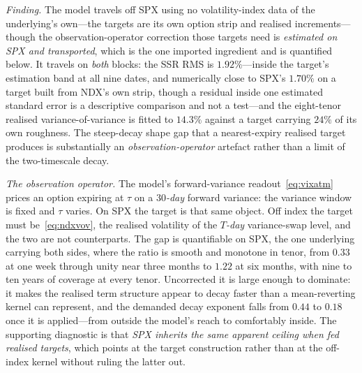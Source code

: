 \documentclass[11pt]{article}
\providecommand{\1}{\mathbf 1}
\begin{document}
\emph{Finding.} The model travels off SPX using no volatility-index data of the underlying's
own---the targets are its own option strip and realised increments---though the
observation-operator correction those targets need is \emph{estimated on SPX and transported}, which
is the one imported ingredient and is quantified below. It travels on \emph{both} blocks: the SSR RMS is $1.92\%$---inside the target's estimation band at all nine dates, and
numerically close to SPX's $1.70\%$ on a target built from NDX's own strip, though a residual
inside one estimated standard error is a descriptive comparison and not a test---and the
eight-tenor realised variance-of-variance is fitted to $14.3\%$ against a target carrying $24\%$ of
its own roughness. The steep-decay shape gap that a nearest-expiry realised target produces is
substantially an \emph{observation-operator} artefact rather than a limit of the two-timescale decay.

\emph{The observation operator.} The model's forward-variance readout~\eqref{eq:vixatm} prices an
option expiring at $\tau$ on a \emph{$30$-day} forward variance: the variance window is fixed and
$\tau$ varies. On SPX the target is that same object. Off index the target must
be~\eqref{eq:ndxvov}, the realised volatility of the \emph{$T$-day} variance-swap level, and the two
are not counterparts. The gap is quantifiable on SPX, the one underlying carrying both sides, where
the ratio is smooth and monotone in
tenor, from $0.33$ at one week through unity near three months to $1.22$ at six months, with nine to
ten years of coverage at every tenor. Uncorrected it is large enough to dominate: it makes the
realised term structure appear to decay faster than a mean-reverting kernel can represent, and the
demanded decay exponent falls from $0.44$ to $0.18$ once it is applied---from outside the model's
reach to comfortably inside. The supporting diagnostic is that \emph{SPX inherits the same apparent
ceiling when fed realised targets}, which points at the target construction rather than at the
off-index kernel without ruling the latter out.
\end{document}
